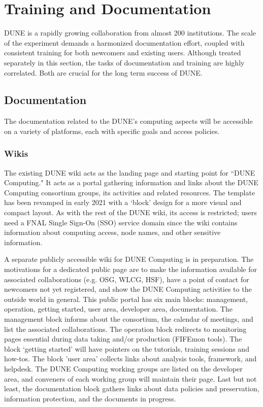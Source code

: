 \documentclass[../main-v1.tex]{subfiles}
\begin{document}
\chapter{Training and Documentation }
\label{ch:train}
DUNE is a rapidly growing collaboration from almost 200 institutions. The scale of the experiment demands a harmonized documentation effort, coupled with consistent training for both newcomers and existing users. Although treated separately in this section, the tasks of documentation and training are highly correlated. Both are crucial for the long term success of DUNE. 

\section{Documentation}
The documentation related to the DUNE’s computing aspects will be accessible on a variety of platforms, each with specific goals and access policies.

\subsection{Wikis}
The existing DUNE wiki acts as the landing page and starting point for ``DUNE Computing." It acts as a portal gathering information and links about the DUNE Computing consortium groups, its activities and related resources. The template has been revamped in early 2021 with a ‘block’ design for a more visual and compact layout. As with the rest of the DUNE wiki, its access is restricted; users need a FNAL Single Sign-On (SSO) service domain since the wiki contains information about computing access, node names, and other sensitive information.

A separate publicly accessible wiki for DUNE Computing is in preparation. The motivations for a dedicated public page are to make the information available for associated collaborations (e.g. OSG, WLCG, HSF), have a point of contact for newcomers not yet registered, and show the DUNE Computing activities to the outside world in general. This public portal has six main blocks: management, operation, getting started, user area, developer area, documentation. The management block informs about the consortium, the calendar of meetings, and list the associated collaborations. The operation block redirects to monitoring pages essential during data taking and/or production (FIFEmon tools). The block ‘getting started’ will have pointers on the tutorials, training sessions and how-tos. The block 'user area' collects links about analysis tools, framework, and helpdesk. The DUNE Computing working groups are listed on the developer area, and conveners of each working group will maintain their page. Last but not least, the documentation block gathers links about data policies and preservation, information protection, and the documents in progress.
\end{document}
